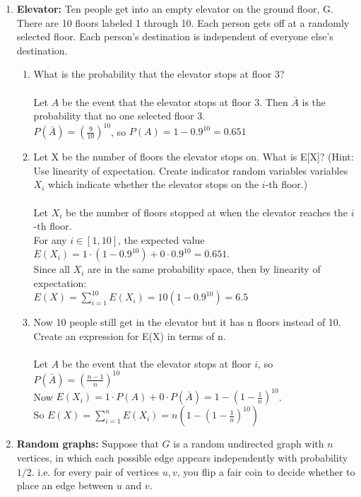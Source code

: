 \documentclass[11pt,fleqn]{article}
\begin{document}
\begin{enumerate}
\newpage
\item \textbf{Elevator:} Ten people get into an empty elevator on the ground floor, G. There are 10 floors labeled 1 through 10. Each
person gets off at a randomly selected floor. Each person's destination is independent of everyone else's
destination.
\begin{enumerate}
\item What is the probability that the elevator stops at floor 3? \\\\
Let $A$ be the event that the elevator stops at floor 3. Then $\bar{A}$ is the probability that no one selected floor 3. \\
$P(\bar{A}) = (\frac9{10})^{10}$, so $P(A) = 1-0.9^{10} = 0.651$ \\
\item Let X be the number of floors the elevator stops on. What is E[X]? (Hint: Use linearity of expectation.
Create indicator random variables variables $X_i$ which indicate whether the elevator stops on the $i$-th floor.) \\\\
Let $X_i$ be the number of floors stopped at when the elevator reaches the $i$-th floor. \\
For any $i \in [1,10]$, the expected value $E(X_i) = 1\cdot(1-0.9^{10}) + 0\cdot0.9^{10} = 0.651$. \\
Since all $X_i$ are in the same probability space, then by linearity of expectation: \\
$\displaystyle E(X) = \sum\limits_{i=1}^{10} E(X_i) = 10(1-0.9^{10}) = 6.5$ \\
\item Now 10 people still get in the elevator but it has n floors instead of 10. Create an expression for E(X)
in terms of n. \\\\
Let $A$ be the event that the elevator stops at floor $i$, so $P(\bar{A}) = (\frac{n-1}n)^{10}$ \\
Now $E(X_i) = 1\cdot P(A) + 0\cdot P(\bar{A}) = 1-(1-\frac1n)^{10}$. \\
So $\displaystyle E(X) = \sum\limits_{i=1}^n E(X_i) = n\left(1-\left(1-\frac1n\right)^{10}\right)$
\end{enumerate}

\newpage
\item \textbf{Random graphs:} Suppose that $G$ is a random undirected graph with $n$ vertices,
in which each possible edge appears independently with probability $1/2$. i.e. 
for every pair of vertices $u, v$, you flip a fair coin to decide whether to place an 
edge between $u$ and $v$. 


\end{enumerate}
\end{document}
